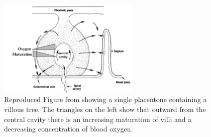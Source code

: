         \begin{figure}
            \centering
            \includegraphics[width=0.6\textwidth]{diagrams/other-paper-figures/hempstock2003.png}
            \caption{Reproduced Figure from \cite{hempstockIntralobularDifferencesAntioxidant2003} showing a single placentone containing a villous tree. The triangles on the left show that outward from the central cavity there is an increasing maturation of villi and a decreasing concentration of blood oxygen.}
            \label{fig:hempstock2003}
        \end{figure}

